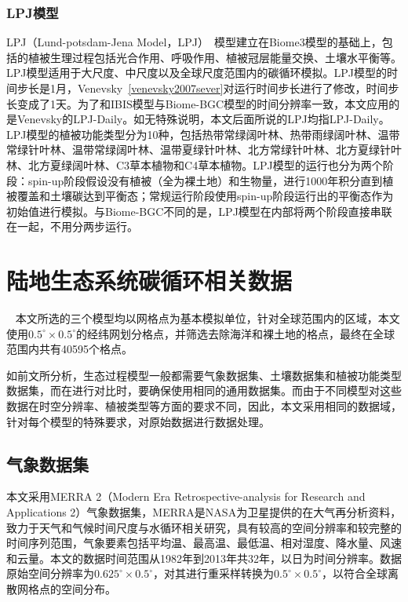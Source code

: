 \subsubsection{LPJ模型}
LPJ（Lund-potsdam-Jena Model，LPJ）~\cite{sitch2003evaluation}模型建立在Biome3模型的基础上，包括的植被生理过程包括光合作用、呼吸作用、植被冠层能量交换、土壤水平衡等。LPJ模型适用于大尺度、中尺度以及全球尺度范围内的碳循环模拟。LPJ模型的时间步长是1月，Venevsky~\ref{venevsky2007sever}对运行时间步长进行了修改，时间步长变成了1天。为了和IBIS模型与Biome-BGC模型的时间分辨率一致，本文应用的是Venevsky的LPJ-Daily。如无特殊说明，本文后面所说的LPJ均指LPJ-Daily。LPJ模型的植被功能类型分为10种，包括热带常绿阔叶林、热带雨绿阔叶林、温带常绿针叶林、温带常绿阔叶林、温带夏绿针叶林、北方常绿针叶林、北方夏绿针叶林、北方夏绿阔叶林、C3草本植物和C4草本植物。LPJ模型的运行也分为两个阶段：spin-up阶段假设没有植被（全为裸土地）和生物量，进行1000年积分直到植被覆盖和土壤碳达到平衡态；常规运行阶段使用spin-up阶段运行出的平衡态作为初始值进行模拟。与Biome-BGC不同的是，LPJ模型在内部将两个阶段直接串联在一起，不用分两步运行。


\section{陆地生态系统碳循环相关数据}
~\label{sec:model-data}
本文所选的三个模型均以网格点为基本模拟单位，针对全球范围内的区域，本文使用$0.5^{\circ} \times 0.5^{\circ}$的经纬网划分格点，并筛选去除海洋和裸土地的格点，最终在全球范围内共有40595个格点。

如前文所分析，生态过程模型一般都需要气象数据集、土壤数据集和植被功能类型数据集，而在进行对比时，要确保使用相同的通用数据集。而由于不同模型对这些数据在时空分辨率、植被类型等方面的要求不同，因此，本文采用相同的数据域，针对每个模型的特殊要求，对原始数据进行数据处理。

\subsection{气象数据集}
本文采用MERRA 2（Modern Era Retrospective-analysis for Research and Applications 2）气象数据集，MERRA是NASA为卫星提供的在大气再分析资料，致力于天气和气候时间尺度与水循环相关研究，具有较高的空间分辨率和较完整的时间序列范围，气象要素包括平均温、最高温、最低温、相对湿度、降水量、风速和云量。本文的数据时间范围从1982年到2013年共32年，以日为时间分辨率。数据原始空间分辨率为$0.625^{\circ} \times 0.5^{\circ}$，对其进行重采样转换为$0.5^{\circ} \times 0.5^{\circ}$，以符合全球离散网格点的空间分布。

